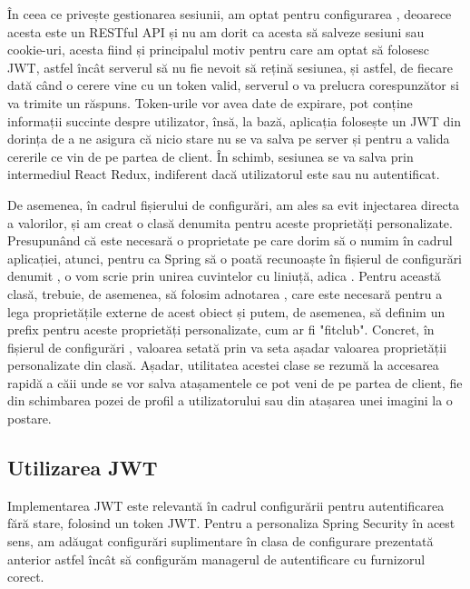 În ceea ce privește gestionarea sesiunii, am optat pentru configurarea , deoarece acesta este un RESTful API și nu am dorit ca acesta să salveze sesiuni sau cookie-uri, acesta fiind și principalul motiv pentru care am optat să folosesc JWT, astfel încât serverul să nu fie nevoit să rețină sesiunea, și astfel, de fiecare dată când o cerere vine cu un token valid, serverul o va prelucra corespunzător si va trimite un răspuns. Token-urile vor avea date de expirare, pot conține informații succinte despre utilizator, însă, la bază, aplicația folosește un JWT din dorința de a ne asigura că nicio stare nu se va salva pe server și pentru a valida cererile ce vin de pe partea de client. În schimb, sesiunea se va salva prin intermediul React Redux, indiferent dacă utilizatorul este sau nu autentificat.\newline

De asemenea, în cadrul fișierului de configurări, am ales sa evit injectarea directa a valorilor, și am creat o clasă denumita  pentru aceste proprietăți personalizate. Presupunând că este necesară o proprietate pe care dorim să o numim  în cadrul aplicației, atunci, pentru ca Spring să o poată recunoaște în fișierul de configurări denumit , o vom scrie prin unirea cuvintelor cu liniuță, adica .
Pentru această clasă, trebuie, de asemenea, să folosim adnotarea , care este necesară pentru a lega proprietățile externe de acest obiect și putem, de asemenea, să definim un prefix pentru aceste proprietăți personalizate, cum ar fi "fitclub". Concret, în fișierul de configurări , valoarea setată prin  va seta așadar valoarea proprietății personalizate din clasă.\newline 
Așadar, utilitatea acestei clase se rezumă la accesarea rapidă a căii unde se vor salva atașamentele ce pot veni de pe partea de client, fie din schimbarea pozei de profil a utilizatorului sau din atașarea unei imagini la o postare.\newline

\subsection{Utilizarea JWT}

Implementarea JWT este relevantă în cadrul configurării pentru autentificarea fără stare, folosind un token JWT. Pentru a personaliza Spring Security în acest sens, am adăugat configurări suplimentare în clasa de configurare prezentată anterior astfel încât să configurăm managerul de autentificare cu furnizorul corect.\newline

